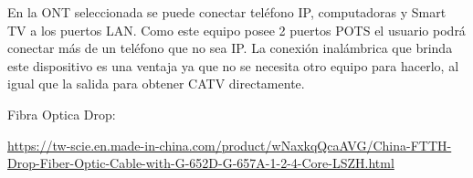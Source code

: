 \begin{enumerate}
\begin{enumerate}
En la ONT seleccionada se puede conectar teléfono IP, computadoras y Smart TV a los puertos LAN. Como este equipo posee 2 puertos POTS el usuario podrá conectar más de un teléfono que no sea IP. La conexión inalámbrica que brinda este dispositivo es una ventaja ya que no se necesita otro equipo para hacerlo, al igual que la salida para obtener CATV directamente. 




\end{enumerate}

\end{enumerate}


\begin{thebibliography}{99}





 Fibra Optica Drop: \begin{tiny}
\url{https://tw-scie.en.made-in-china.com/product/wNaxkqQcaAVG/China-FTTH-Drop-Fiber-Optic-Cable-with-G-652D-G-657A-1-2-4-Core-LSZH.html}
\end{tiny}








\end{thebibliography}



\newpage

